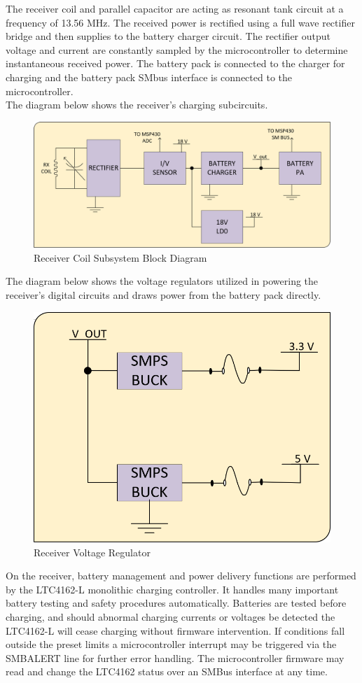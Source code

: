 \documentclass[12pt]{article}
\begin{document}
\hfill

\pagebreak
\indent
The receiver coil and parallel capacitor are acting as resonant tank circuit at a frequency of 13.56 MHz. The received power is rectified using a full wave rectifier bridge and then supplies to the battery charger circuit. The rectifier output voltage and current are constantly sampled by the microcontroller to determine instantaneous received power. The battery pack is connected to the charger for charging and the battery pack SMbus interface is connected to the microcontroller. \\

\indent
The diagram below shows the receiver’s charging subcircuits.
\hfill

\begin{figure}[h!]
\centering
\includegraphics[width=0.88\linewidth]{recv_coil}
\caption{Receiver Coil Subsystem Block Diagram}
\end{figure}

\indent
The diagram below shows the voltage regulators utilized in powering the receiver’s digital circuits and draws power from the battery pack directly.
\hfill

\begin{figure}[h!]
\centering
\includegraphics[width=0.45\linewidth]{recv_sub_volt_reg}
\caption{Receiver Voltage Regulator}
\end{figure}

\hfill
\pagebreak

\indent
On the receiver, battery management and power delivery functions are performed by the LTC4162-L monolithic charging controller. It handles many important battery testing and safety procedures automatically. Batteries are tested before charging, and should abnormal charging currents or voltages be detected the LTC4162-L will cease charging without firmware intervention. If conditions fall outside the preset limits a microcontroller interrupt may be triggered via the SMBALERT line for further error handling. The microcontroller firmware may read and change the LTC4162 status over an SMBus interface at any time.\\
\end{document}
